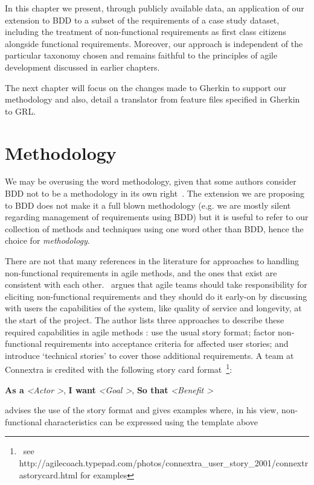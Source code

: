\documentclass[dissertation,final]{softeng}
\newcommand{\nfrs}{non-functional requirements\xspace}
\begin{document}
In this chapter we present, through publicly available data, an application of our extension to BDD to a subset of the requirements of a case study dataset, including the treatment of \nfrs as first class citizens alongside functional requirements. Moreover, our approach is independent of the particular taxonomy chosen and remains faithful to the principles of agile development discussed in earlier chapters. 

The next chapter will focus on the changes made to Gherkin to support our methodology and also, detail a translator from feature files specified in Gherkin to GRL.

\section{Methodology}
We may be overusing the word methodology, given that some authors consider BDD not to be a methodology in its own right~\citep{Smart201410}. The extension we are proposing to BDD does not make it a full blown methodology (e.g. we are mostly silent regarding management of requirements using BDD) but it is useful to refer to our collection of methods and techniques using one word other than BDD, hence the choice for \emph{methodology}.

There are not that many references in the literature for approaches to handling non-functional requirements in agile methods, and the ones that exist are consistent with each other.~\citet{Davies} argues that agile teams should take responsibility for eliciting non-functional requirements and they should do it early-on by discussing with users the capabilities of the system, like quality of service and longevity, at the start of the project. The author lists three approaches to describe these required capabilities in agile methods : use the usual story format; factor \nfrs into acceptance criteria for affected user stories; and introduce `technical stories' to cover those additional requirements. A team at Connextra is credited with the following story card format~\footnote{~see http://agilecoach.typepad.com/photos/connextra\_user\_story\_2001/connextrastorycard.html for examples}:

\begin{displayquote}
\textbf{As a} \textit{\textless Actor \textgreater}, \textbf{I want} \textit{\textless Goal \textgreater}, \textbf{So that} \textit{\textless Benefit \textgreater}
\end{displayquote}

\citet{CohnNFRS} advises the use of the story format and gives examples where, in his view, non-functional characteristics can be expressed using the template above
\end{document}
